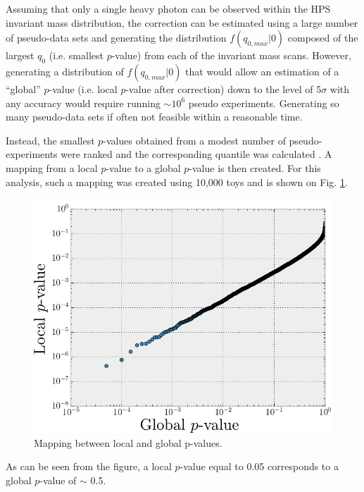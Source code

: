 Assuming that only a single heavy photon can be observed within the HPS invariant
mass distribution, the correction can be estimated using a large number
of pseudo-data sets and generating the distribution 
$f(q_{0, max} | 0)$ composed of the largest $q_{0}$ (i.e. smallest $p$-value)
from each of the invariant mass scans.
However, generating a distribution of $f(q_{0, max} | 0)$ that would allow 
an estimation of a ``global''  
$p$-value (i.e. local $p$-value after correction) down to the level of 5$\sigma$ with any accuracy would 
require running $\sim 10^{6}$ pseudo experiments.  Generating so many pseudo-data 
sets if often not feasible within a reasonable time. 

Instead, the smallest
$p$-values obtained from a modest number of pseudo-experiments were
ranked and the corresponding quantile was calculated \cite{Gross:2010qma}.  
A mapping from a local 
$p$-value to a global $p$-value is then created.  For this analysis, such a mapping
was created using 10,000 toys and is shown on Fig. \ref{fig:global_p_value}.  
\begin{figure}[t]
    \centering
    \includegraphics[width=.8\textwidth]{images/global_p_value_map.png}
    \caption{Mapping between local and global p-values.}
    \label{fig:global_p_value}
\end{figure}
As can be seen from the figure, a 
local $p$-value equal to 0.05 corresponds to a global $p$-value of $\sim$ 0.5.


